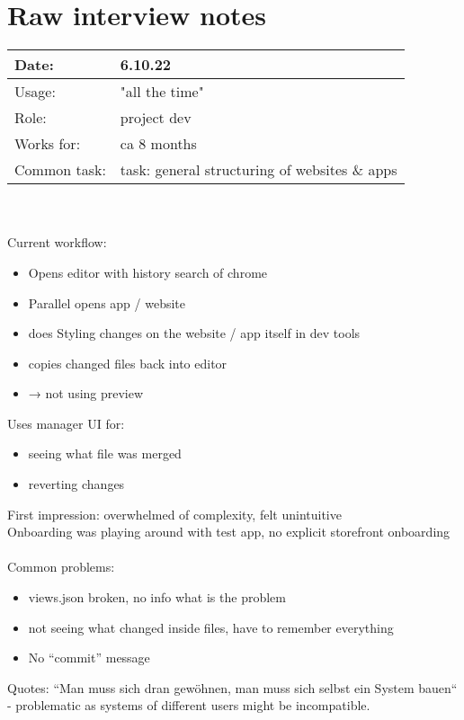 \chapter{Raw interview notes}
\label{app:interviews}

\begin{tabularx}{\linewidth}{lX}
  Date: & 6.10.22 \\
  \hline
  Usage: & "all the time"\\
  \hline
  Role: & project dev \\
  \hline
  Works for: & ca 8 months \\
  \hline
  Common task: & task: general structuring of websites \& apps
\end{tabularx}
\\\\
Current workflow:
\begin{itemize}[nosep]
  \item Opens editor with history search of chrome
  \item Parallel opens app / website
  \item does Styling changes on the website / app itself in dev tools
  \item copies changed files back into editor
  \item → not using preview
\end{itemize}

Uses manager UI for:
\begin{itemize}[nosep]
  \item seeing what file was merged
  \item reverting changes
\end{itemize}

First impression: overwhelmed of complexity, felt unintuitive\\
Onboarding was playing around with test app, no explicit storefront onboarding
\\\\
Common problems:
\begin{itemize}[nosep]
  \item views.json broken, no info what is the problem
  \item not seeing what changed inside files, have to remember everything
  \item No “commit” message
\end{itemize}

Quotes:
“Man muss sich dran gewöhnen, man muss sich selbst ein System bauen“ - problematic as systems of different users might be incompatible.

